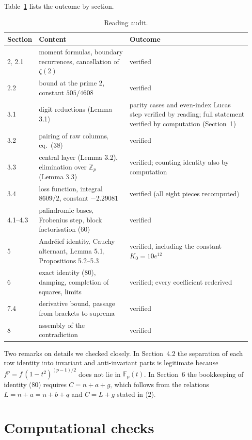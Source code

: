 \documentclass[11pt]{article}
\begin{document}
Table~\ref{tab:reading} lists the outcome by section.

\begin{table}[ht]
\centering
\begin{tabular}{>{\raggedright}p{2.2cm}>{\raggedright}p{6.3cm}>{\raggedright\arraybackslash}p{5.8cm}}
\hline
Section & Content & Outcome\\
\hline
2, 2.1 & moment formulas, boundary recurrences, cancellation of $\zeta(2)$ & verified\\
2.2 & bound at the prime 2, constant $505/4608$ & verified\\
3.1 & digit reductions (Lemma 3.1) & parity cases and even-index Lucas step verified by reading; full statement verified by computation (Section~\ref{sec:comp})\\
3.2 & pairing of raw columns, eq.~(38) & verified\\
3.3 & central layer (Lemma 3.2), elimination over $\mathbb{Z}_p$ (Lemma 3.3) & verified; counting identity also by computation\\
3.4 & loss function, integral $8609/2$, constant $-2.29081$ & verified (all eight pieces recomputed)\\
4.1--4.3 & palindromic bases, Frobenius step, block factorisation (60) & verified\\
5 & Andr\'eief identity, Cauchy alternant, Lemma 5.1, Propositions 5.2--5.3 & verified, including the constant $K_0=10e^{12}$\\
6 & exact identity (80), damping, completion of squares, limits & verified; every coefficient rederived\\
7.4 & derivative bound, passage from brackets to suprema & verified\\
8 & assembly of the contradiction & verified\\
\hline
\end{tabular}
\caption{Reading audit.}
\label{tab:reading}
\end{table}

Two remarks on details we checked closely. In Section~4.2 the separation of each row identity into invariant and anti-invariant parts is legitimate because $f^p=f\,(1-t^2)^{(p-1)/2}$ does not lie in $\mathbb{F}_p(t)$. In Section~6 the bookkeeping of identity (80) requires $C=n+a+g$, which follows from the relations $L=n+a=n+b+q$ and $C=L+g$ stated in (2).

\section{Computational checks}
\label{sec:comp}
\end{document}
